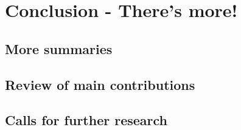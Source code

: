 \chapter{Conclusion - There's more!}
\section{More summaries}
\section{Review of main contributions}
\section{Calls for further research}